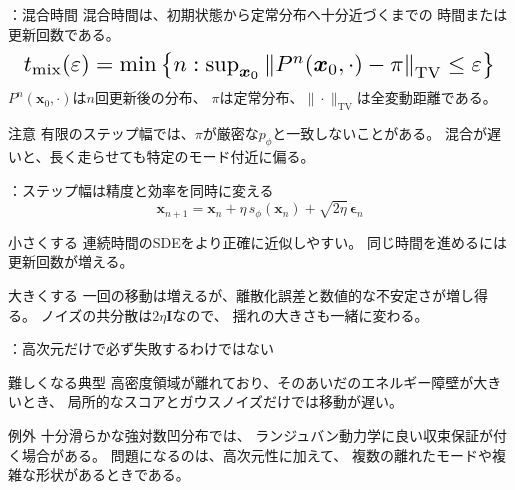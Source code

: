 \assuppl
\begin{frame}{\supplmark：混合時間}
    混合時間は、初期状態から定常分布へ十分近づくまでの
    時間または更新回数である。
    \[
        \resizebox{0.98\textwidth}{!}{$
        t_{\mathrm{mix}}(\varepsilon)
        =
        \min\left\{
        n:
        \sup_{\bm{x}_0}
        \left\|P^{n}(\bm{x}_0,\cdot)-\pi\right\|_{\mathrm{TV}}
        \le\varepsilon
        \right\}
        $}
\]
    $P^{n}(\bm{x}_0,\cdot)$は$n$回更新後の分布、
    $\pi$は定常分布、$\|\cdot\|_{\mathrm{TV}}$は全変動距離である。
    \begin{exampleblock}{注意}
        有限のステップ幅では、$\pi$が厳密な$p_\phi$と一致しないことがある。
        混合が遅いと、長く走らせても特定のモード付近に偏る。
    \end{exampleblock}
\end{frame}
\assuppl
\begin{frame}{\supplmark：ステップ幅は精度と効率を同時に変える}
    \[
        \bm{x}_{n+1}
        =
        \bm{x}_n
        +\eta\,s_\phi(\bm{x}_n)
        +\sqrt{2\eta}\,\bm{\epsilon}_n
        \tag{3.1.5}
\]
    \begin{exampleblock}{小さくする}
        連続時間のSDEをより正確に近似しやすい。
        同じ時間を進めるには更新回数が増える。
    \end{exampleblock}
    \begin{exampleblock}{大きくする}
        一回の移動は増えるが、離散化誤差と数値的な不安定さが増し得る。
        ノイズの共分散は$2\eta\bm{I}$なので、
        揺れの大きさも一緒に変わる。
    \end{exampleblock}
\end{frame}
\assuppl
\begin{frame}{\supplmark：高次元だけで必ず失敗するわけではない}
    \begin{exampleblock}{難しくなる典型}
        高密度領域が離れており、そのあいだのエネルギー障壁が大きいとき、
        局所的なスコアとガウスノイズだけでは移動が遅い。
    \end{exampleblock}
    \begin{exampleblock}{例外}
        十分滑らかな強対数凹分布では、
        ランジュバン動力学に良い収束保証が付く場合がある。
        問題になるのは、高次元性に加えて、
        複数の離れたモードや複雑な形状があるときである。
    \end{exampleblock}
\end{frame}
